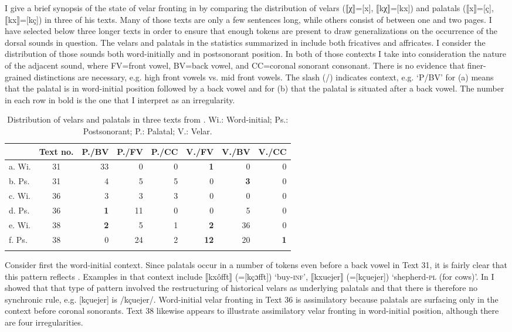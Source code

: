 {I give a brief synopsis of the state of velar fronting in \citet{Schweizer1939} by comparing the distribution of velars (⟦χ⟧=[x], ⟦kχ⟧=[kx]) and palatals (⟦x⟧=[ç], ⟦kx⟧=[kç]) in three of his texts. Many of those texts are only a few sentences long, while others consist of between one and two pages. I have selected below three longer texts in order to ensure that enough tokens are present to draw generalizations on the occurrence of the dorsal sounds in question. The velars and palatals in the statistics summarized in  include both fricatives and affricates. I consider the distribution of those sounds both word-initially and in postsonorant position. In both of those contexts I take into consideration the nature of the adjacent sound, where FV=front vowel, BV=back vowel, and CC=coronal sonorant consonant. There is no evidence that finer-grained distinctions are necessary, e.g. high front vowels vs. mid front vowels. The slash (/) indicates context, e.g. ‘P/BV’ for (a) means that the palatal is in word-initial position followed by a back vowel and for (b) that the palatal is situated after a back vowel. The number in each row in bold is the one that I interpret as an irregularity.

\begin{table}%
\caption{Distribution of velars and palatals in three texts from \citet{Schweizer1939}. Wi.: Word-initial; Ps.: Postsonorant; P.: Palatal; V.: Velar.}
\label{tab:fromex:15:12}
\begin{tabular}{lcrrrrrr}
\lsptoprule
    & Text no. & P./BV & P./FV & P./CC & V./FV & V./BV & V./CC\\\midrule
a. Wi. & 31 & 33 & 0 & 0 &  \textbf{1} & 0 & 0\\
b. Ps. & 31 & 4 & 5 & 5 & 0 & \textbf{3} & 0\\\tablevspace
c. Wi. & 36 & 3 & 3 & 3 & 0 & 0 & 0 \\
d. Ps. & 36 &  \textbf{1}  & 11 & 0 & 0 & 5 & 0\\\tablevspace
e. Wi. & 38 & \textbf{2} & 5 & 1 & \textbf{2} & 36 & 0 \\
f. Ps. & 38 & 0 & 24 & 2 & \textbf{12}  & 20 & \textbf{1}\\
\lspbottomrule
\end{tabular}
\end{table}

Consider first the word-initial context. Since palatals occur in a number of tokens even before a back vowel in Text 31, it is fairly clear that this pattern reflects . Examples in that context include ⟦kxôfft⟧ (=[kçɔfft]) ‘buy-\textsc{inf}’, ⟦kxuejer⟧ (=[kçuejer]) ‘shepherd-\textsc{pl} (for cows)’.  In  I showed that that type of pattern involved the restructuring of historical velars as underlying palatals and that there is therefore no synchronic rule, e.g. [kçuejer] is /kçuejer/. Word-initial velar fronting in Text 36 is assimilatory because palatals are surfacing only in the context before coronal sonorants. Text 38 likewise appears to illustrate assimilatory velar fronting in word-initial position, although there are four irregularities.

}
